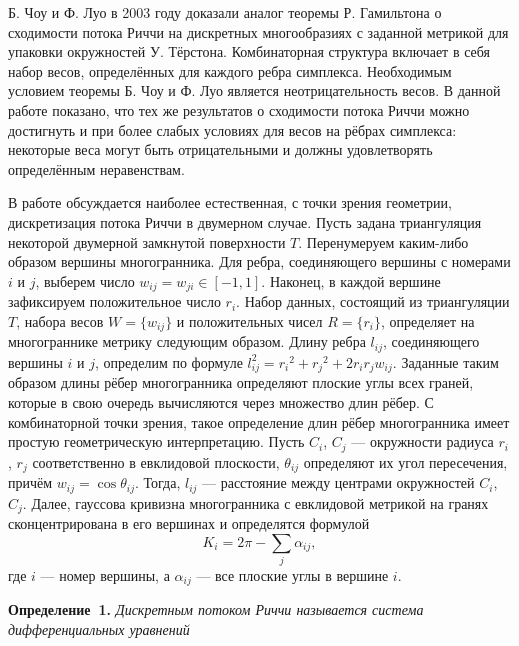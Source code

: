 


\vzmscaption


Б. Чоу и Ф. Луо в 2003 году доказали аналог теоремы Р. Гамильтона о сходимости потока Риччи на дискретных многообразиях с заданной метрикой для  упаковки окружностей У. Тёрстона. Комбинаторная структура включает в себя набор весов, определённых для каждого ребра симплекса. Необходимым условием теоремы Б. Чоу и Ф. Луо является неотрицательность весов. В данной работе показано, что тех же результатов о сходимости потока Риччи можно достигнуть и при более слабых условиях для весов на рёбрах симплекса: некоторые веса могут быть отрицательными и должны удовлетворять определённым неравенствам.

В работе обсуждается наиболее
естественная, с точки
зрения геометрии, дискретизация потока
Риччи в двумерном случае.
Пусть задана триангуляция некоторой
двумерной замкнутой поверхности $T$.
Перенумеруем каким-либо образом вершины
многогранника. Для ребра,
соединяющего вершины с номерами $i$ и $j$,
выберем число $ w_{ij} =
w_{ji} \in [-1,1]$. Наконец, в каждой вершине
зафиксируем
положительное число $r_i$. Набор данных,
состоящий из триангуляции
$T$, набора весов $W = \{ w_{ij} \}$ и положительных чисел
$R = \{ r_i \}$, определяет на многограннике
метрику следующим
образом. Длину ребра $l_{ij}$, соединяющего
вершины $i$ и $j$,
определим по формуле $l_{ij}^2 = {r_i}^2 + {r_j}^2 +
2r_i
r_jw_{ij}$. Заданные таким образом длины
рёбер многогранника
определяют плоские углы всех граней, которые в свою очередь вычисляются через множество длин рёбер.
С комбинаторной точки зрения, такое определение длин рёбер многогранника имеет простую геометрическую интерпретацию. Пусть  $C_i$, $C_j$ --- окружности радиуса $r_i$, $r_j$ соответственно  в евклидовой плоскости, $ \theta_{ij} $ определяют их угол пересечения, причём $ w_{ij} = \cos \theta_{ij} $. Тогда, $l_{ij}$ --- расстояние между центрами окружностей $C_i$, $C_j$.
Далее, гауссова кривизна многогранника с
евклидовой метрикой на
гранях сконцентрирована в его вершинах и
определятся формулой
$$
K_i = 2 \pi - \sum_{j} \alpha_{ij},
$$
где $i$ --- номер вершины, а $\alpha_{ij}$ --- все
плоские углы в
вершине $i$.

\textbf{Определение~1.} {\it
Дискретным потоком Риччи называется
система дифференциальных уравнений}

